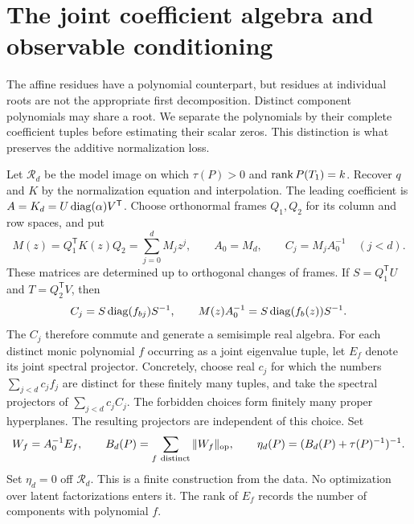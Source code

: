 \section{The joint coefficient algebra and observable conditioning}
\label{sec:joint}
The affine residues have a polynomial counterpart, but residues at
individual roots are not the appropriate first decomposition. Distinct
component polynomials may share a root. We separate the polynomials by
their complete coefficient tuples before estimating their scalar zeros.
This distinction is what preserves the additive normalization loss.

Let $\mathcal R_d$ be the model image on which $\tau(P)>0$ and
$\operatorname{rank} P(T_1)=k$. Recover $q$ and $K$ by the normalization equation and
interpolation. The leading coefficient is
$A=K_d=U\operatorname{diag}(\alpha)V^{\mathsf T}$. Choose orthonormal frames
$Q_1,Q_2$ for its column and row spaces, and put
\[
 M(z)=Q_1^{\mathsf T}K(z)Q_2=\sum_{j=0}^dM_jz^j,
 \qquad A_0=M_d,\qquad C_j=M_jA_0^{-1}\quad(j<d).
\]
These matrices are determined up to orthogonal changes of frames. If
$S=Q_1^{\mathsf T}U$ and $T=Q_2^{\mathsf T}V$, then
\begin{equation}\label{eq:joint-algebra}
 C_j=S\operatorname{diag}(f_{bj})S^{-1},\qquad
 M(z)A_0^{-1}=S\operatorname{diag}(f_b(z))S^{-1}.
\end{equation}
The $C_j$ therefore commute and generate a semisimple real algebra.
For each distinct monic polynomial $f$ occurring as a joint eigenvalue
tuple, let $E_f$ denote its joint spectral projector. Concretely, choose
real $c_j$ for which the numbers $\sum_{j<d}c_jf_j$ are distinct for
these finitely many tuples, and take the spectral projectors of
$\sum_{j<d}c_jC_j$. The forbidden choices form finitely many proper
hyperplanes. The resulting projectors are independent of this choice.
Set
\begin{equation}\label{eq:joint-condition}
 W_f=A_0^{-1}E_f,\qquad
 B_d(P)=\sum_{f\ {\rm distinct}}\|W_f\|_{\mathrm{op}},
 \qquad \eta_d(P)=(B_d(P)+\tau(P)^{-1})^{-1}.
\end{equation}
Set $\eta_d=0$ off $\mathcal R_d$. This is a finite construction from
the data. No optimization over latent factorizations enters it. The
rank of $E_f$ records the number of components with polynomial $f$.

